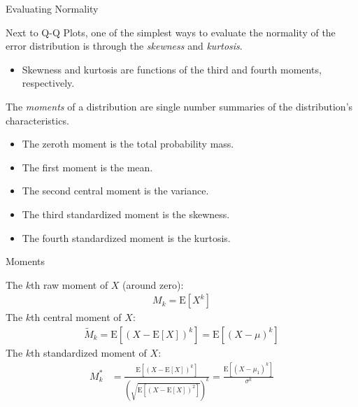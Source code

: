 \documentclass{beamer}\usepackage[]{graphicx}\usepackage[]{color}
\begin{document}
\watermarkon %

\begin{frame}[allowframebreaks]{Evaluating Normality}
  
  Next to Q-Q Plots, one of the simplest ways to evaluate the normality of the 
  error distribution is through the \emph{skewness} and \emph{kurtosis}.
  \begin{itemize}
  \item Skewness and kurtosis are functions of the third and fourth moments, 
    respectively.
  \end{itemize}
  \vb
  The \emph{moments} of a distribution are single number summaries of the 
  distribution's characteristics.
  \begin{itemize}
  \item The zeroth moment is the total probability mass.
  \item The first moment is the mean.
  \item The second central moment is the variance.
  \item The third standardized moment is the skewness.
  \item The fourth standardized moment is the kurtosis.
  \end{itemize}
  
\end{frame}


\begin{frame}{Moments}
  
  The $k$th raw moment of $X$ (around zero):
  \begin{align*}
    M_k = \text{E}\left[X^k\right]
  \end{align*}
  The $k$th central moment of $X$:
  \begin{align*}
    \widetilde{M}_k = \text{E}\left[(X - \text{E}[X])^k\right] = \text{E}\left[(X - \mu)^k\right]
  \end{align*}
  The $k$th standardized moment of $X$:
  \begin{align*}
    M_k^* &= \frac{\text{E}\left[(X - \text{E}[X])^k\right]}{\left(\sqrt{\text{E}\left[(X - \text{E}[X])^2\right]}\right)^k} = \frac{\text{E}\left[(X - \mu_1)^k\right]}{\sigma^k}
  \end{align*}
  
\end{frame}
\end{document}
